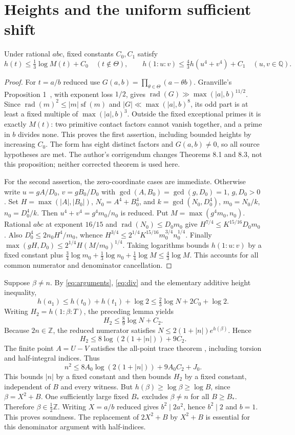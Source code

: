 \documentclass[11pt,a4paper]{article}
\newcommand{\Q}{\mathbb Q}\newcommand{\Z}{\mathbb Z}\DeclareMathOperator{\Tr}{Tr}\DeclareMathOperator{\Nm}{Nm}\DeclareMathOperator{\rad}{rad}
\begin{document}
\section{Heights and the uniform sufficient shift}
\begin{lemma}\label{lem:abc}
Under rational $abc$, fixed constants $C_0,C_1$ satisfy
\[
 h(t)\le\tfrac13\log M(t)+C_0\quad(t\notin\Theta),\qquad
 h(1:u:v)\le\tfrac43 h(u^4+v^4)+C_1\quad(u,v\in\Q).
\]
\end{lemma}
\begin{proof}
For $t=a/b$ reduced use $G(a,b)=\prod_{\theta\in\Theta}(a-\theta b)$.
Granville's Proposition 1~\cite{Granville}, with exponent loss $1/2$,
gives $\rad(G)\gg\max(|a|,b)^{11/2}$. Since
$\rad(m)^2\le |m|\operatorname{sf}(m)$ and
$|G|\ll\max(|a|,b)^8$, its odd part is at least a fixed multiple of
$\max(|a|,b)^3$. Outside the fixed exceptional primes it is exactly
$M(t)$: two primitive contact factors cannot vanish together, and a
prime in $b$ divides none. This proves the first assertion, including
bounded heights by increasing $C_0$. The form has eight distinct
factors and $G(a,b)\ne0$, so all source hypotheses are met.
The author's corrigendum changes Theorems 8.1 and 8.3, not this
proposition; neither corrected theorem is used here.

For the second assertion, the zero-coordinate cases are immediate.
Otherwise write $u=gA/D_0$, $v=gB_0/D_0$ with
$\gcd(A,B_0)=\gcd(g,D_0)=1$, $g,D_0>0$. Set
$H=\max(|A|,|B_0|)$, $N_0=A^4+B_0^4$, and
$k=\gcd(N_0,D_0^4)$, $m_0=N_0/k$, $n_0=D_0^4/k$.
Then $u^4+v^4=g^4m_0/n_0$ is reduced. Put
$M=\max(g^4m_0,n_0)$. Rational $abc$ at exponent $16/15$ and
$\rad(N_0)\le D_0m_0$ give
$H^{7/4}\le K^{15/16}D_0m_0$. Also
$D_0^4\le2n_0H^4/m_0$, whence
$H^{3/4}\le2^{1/4}K^{15/16}m_0^{3/4}n_0^{1/4}$.
Finally $\max(gH,D_0)\le2^{1/4}H(M/m_0)^{1/4}$. Taking logarithms
bounds $h(1:u:v)$ by a fixed constant plus
$\frac34\log m_0+\frac13\log n_0+\frac14\log M\le\frac43\log M$.
This accounts for all common numerator and denominator cancellation.
\end{proof}

Suppose $\beta\ne n$. By \eqref{eq:arguments}, \eqref{eq:div} and
the elementary additive height inequality,
\[
 h(a_1)\le h(t_0)+h(t_1)+\log2\le\tfrac23\log N+2C_0+\log2.
\]
Writing $H_2=h(1:\beta:T)$, the preceding lemma yields
\[
                         H_2\le\tfrac89\log N+C_2.
\]
Because $2n\in\Z$, the reduced numerator satisfies
$N\le2(1+|n|)e^{h(\beta)}$. Hence
\[
             H_2\le8\log(2(1+|n|))+9C_2.
\]
The finite point $A=U-V$ satisfies the all-point trace theorem
\cite[Corollary 1.3]{TraceAll}, including torsion and half-integral
indices. Thus
\[
 n^2\le8A_0\log(2(1+|n|))+9A_0C_2+J_0.
\]
This bounds $|n|$ by a fixed constant and then bounds $H_2$ by a fixed
constant, independent of $B$ and every witness. But
$h(\beta)\ge\log\beta\ge\log B$, since $\beta=X^2+B$.
One sufficiently large fixed $B_*$ excludes $\beta\ne n$ for all
$B\ge B_*$. Therefore $\beta\in\frac12\Z$.
Writing $X=a/b$ reduced gives $b^2\mid2a^2$, hence $b^2\mid2$ and
$b=1$. This proves soundness. The replacement of $2X^2+B$ by
$X^2+B$ is essential for this denominator argument with half-indices.
\end{document}
